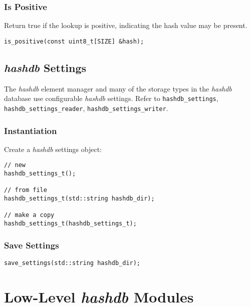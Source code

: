 \documentclass[12pt,twoside]{article}
\newcommand{\hdb}{\emph{hashdb}\xspace}
\begin{document}
\subsubsection{Is Positive}
Return true if the lookup is positive, indicating the hash value may be present.
\begin{small}
\begin{verbatim}
is_positive(const uint8_t[SIZE] &hash);
\end{verbatim}
\end{small}


\subsection{\hdb Settings}
The \hdb element manager and
many of the storage types in the \hdb database use configurable \hdb settings.
Refer to \texttt{hashdb\_settings}, \texttt{hashdb\_settings\_reader},
\texttt{hashdb\_settings\_writer}. 

\subsubsection{Instantiation}
Create a \hdb settings object:

\begin{small}
\begin{verbatim}
// new
hashdb_settings_t();

// from file
hashdb_settings_t(std::string hashdb_dir);

// make a copy
hashdb_settings_t(hashdb_settings_t);
\end{verbatim}
\end{small}

\subsubsection{Save Settings}
\begin{small}
\begin{verbatim}
save_settings(std::string hashdb_dir);
\end{verbatim}
\end{small}


\section{Low-Level \hdb Modules}

\end{document}
